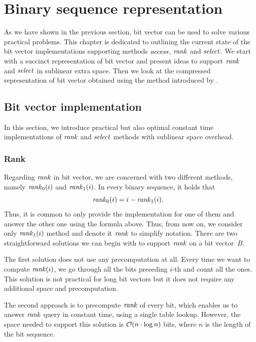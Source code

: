 \chapter{Binary sequence representation}
\label{kap:kap2}

As we have shown in the previous section, bit vector can be used to solve various practical
problems. This chapter is dedicated to outlining the current state of the bit vector
implementations supporting methods $\mathit{access}$, $\mathit{rank}$ and $\mathit{select}$. We start with a succinct
representation of bit vector and present ideas to support $\mathit{rank}$ and $\mathit{select}$ in sublinear
extra space. Then we look at the compressed representation of bit vector obtained using the
method introduced by \cite{raman2007succinct}.

\section{Bit vector implementation}

In this section, we introduce practical but also optimal constant time implementations of
$\mathit{rank}$ and $\mathit{select}$ methods with sublinear space overhead.

\subsection{Rank}
\label{section:rank}

Regarding $\mathit{rank}$ in bit vector, we are concerned with two different methods, namely $\mathit{rank}_0(i)$
and $\mathit{rank}_1(i)$. In every binary sequence, it holds that $$\mathit{rank}_0(i) = i - \mathit{rank}_1(i).$$
Thus, it is common to only provide the implementation for one of them and answer the other one
using the formula above. Thus, from now on, we consider only $\mathit{rank}_1(i)$ method and denote
it $\mathit{rank}$ to simplify notation. There are two straightforward solutions we can begin with to
support $\mathit{rank}$ on a bit vector~$B$.

The first solution does not use any precomputation at all. Every time we want
to compute $\mathit{rank}(i)$, we go through all the bits preceding $i$-th and count all
the ones. This solution is not practical for long bit vectors but it does not require
any additional space and precomputation.

The second approach is to precompute $\mathit{rank}$ of every bit, which enables us to answer
$\mathit{rank}$ query in constant time, using a single table lookup. However, the space needed to
support this solution is $\mathcal{O}(n\cdot\log n)$ bits, where $n$ is the length of the
bit sequence.

